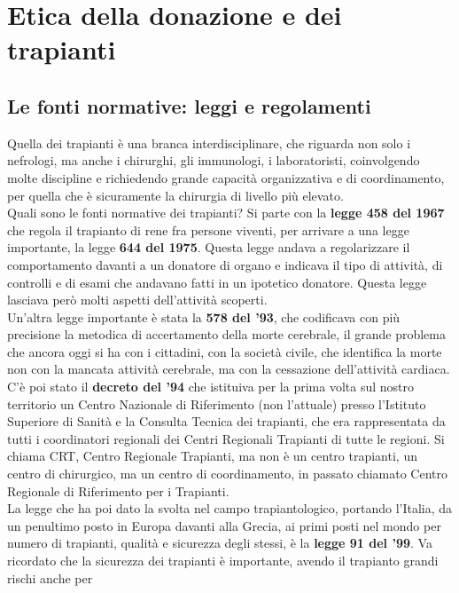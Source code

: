 
\section{Etica della donazione e dei trapianti}
 

\subsection{Le fonti normative: leggi e regolamenti}


Quella dei trapianti è una branca interdisciplinare, che riguarda non
solo i nefrologi, ma anche i chirurghi, gli immunologi, i laboratoristi,
coinvolgendo molte discipline e richiedendo grande capacità
organizzativa e di coordinamento, per quella che è sicuramente la
chirurgia di livello più elevato.
\\
Quali sono le fonti normative dei trapianti? Si parte con la
\textbf{legge 458 del 1967} che regola il trapianto di rene fra persone
viventi, per arrivare a una legge importante, la legge \textbf{644 del
1975}. Questa legge andava a regolarizzare il comportamento davanti a un
donatore di organo e indicava il tipo di attività, di controlli e di
esami che andavano fatti in un ipotetico donatore. Questa legge lasciava
però molti aspetti dell'attività scoperti.
\\
Un'altra legge importante è stata la \textbf{578 del '93}, che
codificava con più precisione la metodica di accertamento della morte
cerebrale, il grande problema che ancora oggi si ha con i cittadini, con
la società civile, che identifica la morte non con la mancata attività
cerebrale, ma con la cessazione dell'attività cardiaca.
\\
C'è poi stato il \textbf{decreto del '94} che istituiva per la prima
volta sul nostro territorio un Centro Nazionale di Riferimento (non
l'attuale) presso l'Istituto Superiore di Sanità e la Consulta Tecnica
dei trapianti, che era rappresentata da tutti i coordinatori regionali
dei Centri Regionali Trapianti di tutte le regioni. Si chiama CRT,
Centro Regionale Trapianti, ma non è un centro trapianti, un centro di
chirurgico, ma un centro di coordinamento, in passato chiamato Centro
Regionale di Riferimento per i Trapianti.
\\
La legge che ha poi dato la svolta nel campo trapiantologico, portando
l'Italia, da un penultimo posto in Europa davanti alla Grecia, ai primi
posti nel mondo per numero di trapianti, qualità e sicurezza degli
stessi, è la \textbf{legge 91 del '99}. Va ricordato che la sicurezza
dei trapianti è importante, avendo il trapianto grandi rischi anche per
